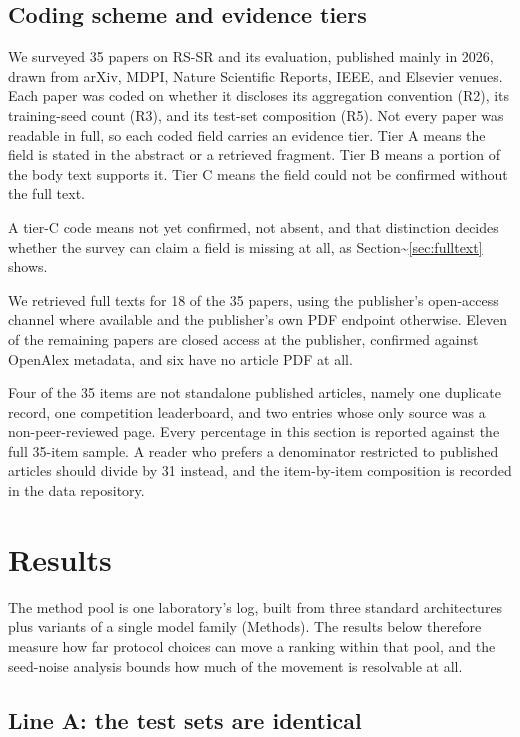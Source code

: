 \documentclass{interact}
\begin{document}
\subsection{Coding scheme and evidence tiers}\label{sec:coding}

We surveyed 35 papers on RS-SR and its evaluation, published mainly in 2026, drawn from arXiv, MDPI, Nature Scientific Reports, IEEE, and Elsevier venues. Each paper was coded on whether it discloses its aggregation convention (R2), its training-seed count (R3), and its test-set composition (R5). Not every paper was readable in full, so each coded field carries an evidence tier. Tier A means the field is stated in the abstract or a retrieved fragment. Tier B means a portion of the body text supports it. Tier C means the field could not be confirmed without the full text.

A tier-C code means not yet confirmed, not absent, and that distinction decides whether the survey can claim a field is missing at all, as Section\textasciitilde{}\ref{sec:fulltext} shows.

We retrieved full texts for 18 of the 35 papers, using the publisher's open-access channel where available and the publisher's own PDF endpoint otherwise. Eleven of the remaining papers are closed access at the publisher, confirmed against OpenAlex metadata, and six have no article PDF at all.

Four of the 35 items are not standalone published articles, namely one duplicate record, one competition leaderboard, and two entries whose only source was a non-peer-reviewed page. Every percentage in this section is reported against the full 35-item sample. A reader who prefers a denominator restricted to published articles should divide by 31 instead, and the item-by-item composition is recorded in the data repository.

\section{Results}\label{sec:results}

The method pool is one laboratory's log, built from three standard architectures plus variants of a single model family (Methods). The results below therefore measure how far protocol choices can move a ranking within that pool, and the seed-noise analysis bounds how much of the movement is resolvable at all.

\subsection{Line A: the test sets are identical}\label{sec:testsets}
\end{document}
